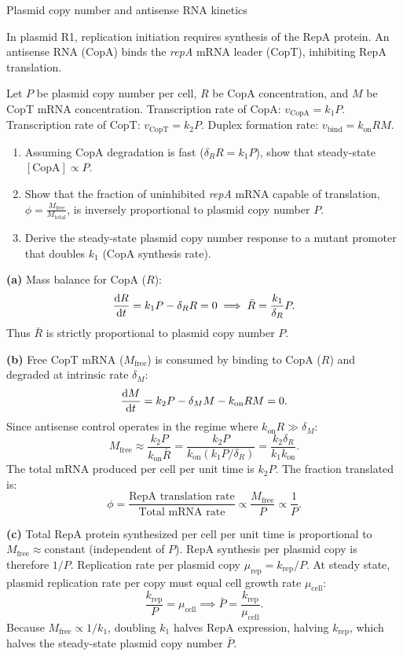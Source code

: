 \documentclass[12pt, a4paper, oneside]{report}
\begin{document}
\begin{problem}{\enspace{}\enspace
  Plasmid copy number and antisense RNA kinetics}

  In plasmid R1, replication initiation requires synthesis of the RepA protein. An antisense RNA (CopA) binds the \textit{repA} mRNA leader (CopT), inhibiting RepA translation.

  Let $P$ be plasmid copy number per cell, $R$ be CopA concentration, and $M$ be CopT mRNA concentration.
  Transcription rate of CopA: $v_{\text{CopA}} = k_1 P$.
  Transcription rate of CopT: $v_{\text{CopT}} = k_2 P$.
  Duplex formation rate: $v_{\text{bind}} = k_{\text{on}} R M$.

  \begin{enumerate}
    \item Assuming CopA degradation is fast ($\delta_R R = k_1 P$), show that steady-state $[\text{CopA}] \propto P$.
    \item Show that the fraction of uninhibited \textit{repA} mRNA capable of translation, $\phi = \frac{M_{\text{free}}}{M_{\text{total}}}$, is inversely proportional to plasmid copy number $P$.
    \item Derive the steady-state plasmid copy number response to a mutant promoter that doubles $k_1$ (CopA synthesis rate).
  \end{enumerate}
\end{problem}

\begin{solution}
  \textbf{(a)} Mass balance for CopA ($R$):
  \[
    \frac{\mathrm{d}R}{\mathrm{d}t} = k_1 P - \delta_R R = 0 \implies \bar{R} = \frac{k_1}{\delta_R} P.
  \]
  Thus $\bar{R}$ is strictly proportional to plasmid copy number $P$.

  \textbf{(b)} Free CopT mRNA ($M_{\text{free}}$) is consumed by binding to CopA ($R$) and degraded at intrinsic rate $\delta_M$:
  \[
    \frac{\mathrm{d}M}{\mathrm{d}t} = k_2 P - \delta_M M - k_{\text{on}} R M = 0.
  \]
  Since antisense control operates in the regime where $k_{\text{on}} R \gg \delta_M$:
  \[
    M_{\text{free}} \approx \frac{k_2 P}{k_{\text{on}} \bar{R}} = \frac{k_2 P}{k_{\text{on}} (k_1 P / \delta_R)} = \frac{k_2 \delta_R}{k_1 k_{\text{on}}}.
  \]
  The total mRNA produced per cell per unit time is $k_2 P$. The fraction translated is:
  \[
    \phi = \frac{\text{RepA translation rate}}{\text{Total mRNA rate}} \propto \frac{M_{\text{free}}}{P} \propto \frac{1}{P}.
  \]

  \textbf{(c)} Total RepA protein synthesized per cell per unit time is proportional to $M_{\text{free}} \approx \text{constant}$ (independent of $P$). RepA synthesis per plasmid copy is therefore $1/P$.
  Replication rate per plasmid copy $\mu_{\text{rep}} = k_{\text{rep}} / P$. At steady state, plasmid replication rate per copy must equal cell growth rate $\mu_{\text{cell}}$:
  \[
    \frac{k_{\text{rep}}}{P} = \mu_{\text{cell}} \implies \bar{P} = \frac{k_{\text{rep}}}{\mu_{\text{cell}}}.
  \]
  Because $M_{\text{free}} \propto 1/k_1$, doubling $k_1$ halves RepA expression, halving $k_{\text{rep}}$, which halves the steady-state plasmid copy number $\bar{P}$.
\end{solution}
\end{document}
